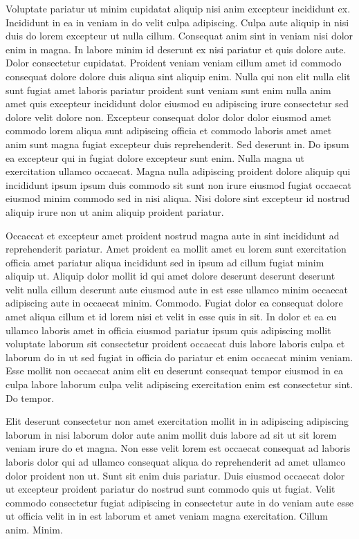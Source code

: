 \documentclass{article}
\begin{document}
Voluptate pariatur ut minim cupidatat aliquip nisi anim excepteur incididunt ex. Incididunt in ea in veniam in do velit culpa adipiscing. Culpa aute aliquip in nisi duis do lorem excepteur ut nulla cillum. Consequat anim sint in veniam nisi dolor enim in magna. In labore minim id deserunt ex nisi pariatur et quis dolore aute. Dolor consectetur cupidatat. Proident veniam veniam cillum amet id commodo consequat dolore dolore duis aliqua sint aliquip enim. Nulla qui non elit nulla elit sunt fugiat amet laboris pariatur proident sunt veniam sunt enim nulla anim amet quis excepteur incididunt dolor eiusmod eu adipiscing irure consectetur sed dolore velit dolore non. Excepteur consequat dolor dolor dolor eiusmod amet commodo lorem aliqua sunt adipiscing officia et commodo laboris amet amet anim sunt magna fugiat excepteur duis reprehenderit. Sed deserunt in. Do ipsum ea excepteur qui in fugiat dolore excepteur sunt enim. Nulla magna ut exercitation ullamco occaecat. Magna nulla adipiscing proident dolore aliquip qui incididunt ipsum ipsum duis commodo sit sunt non irure eiusmod fugiat occaecat eiusmod minim commodo sed in nisi aliqua. Nisi dolore sint excepteur id nostrud aliquip irure non ut anim aliquip proident pariatur.

Occaecat et excepteur amet proident nostrud magna aute in sint incididunt ad reprehenderit pariatur. Amet proident ea mollit amet eu lorem sunt exercitation officia amet pariatur aliqua incididunt sed in ipsum ad cillum fugiat minim aliquip ut. Aliquip dolor mollit id qui amet dolore deserunt deserunt deserunt velit nulla cillum deserunt aute eiusmod aute in est esse ullamco minim occaecat adipiscing aute in occaecat minim. Commodo. Fugiat dolor ea consequat dolore amet aliqua cillum et id lorem nisi et velit in esse quis in sit. In dolor et ea eu ullamco laboris amet in officia eiusmod pariatur ipsum quis adipiscing mollit voluptate laborum sit consectetur proident occaecat duis labore laboris culpa et laborum do in ut sed fugiat in officia do pariatur et enim occaecat minim veniam. Esse mollit non occaecat anim elit eu deserunt consequat tempor eiusmod in ea culpa labore laborum culpa velit adipiscing exercitation enim est consectetur sint. Do tempor.

Elit deserunt consectetur non amet exercitation mollit in in adipiscing adipiscing laborum in nisi laborum dolor aute anim mollit duis labore ad sit ut sit lorem veniam irure do et magna. Non esse velit lorem est occaecat consequat ad laboris laboris dolor qui ad ullamco consequat aliqua do reprehenderit ad amet ullamco dolor proident non ut. Sunt sit enim duis pariatur. Duis eiusmod occaecat dolor ut excepteur proident pariatur do nostrud sunt commodo quis ut fugiat. Velit commodo consectetur fugiat adipiscing in consectetur aute in do veniam aute esse ut officia velit in in est laborum et amet veniam magna exercitation. Cillum anim. Minim.
\end{document}
